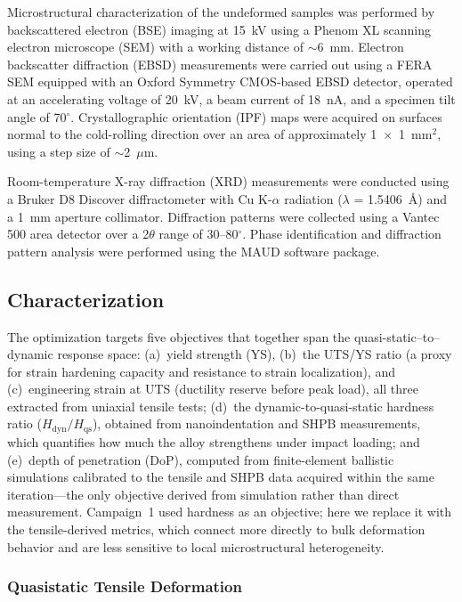 \documentclass[preprint,12pt,times]{elsarticle}  %
\begin{document}
Microstructural characterization of the undeformed samples was performed by backscattered electron (BSE) imaging at 15~kV using a Phenom XL scanning electron microscope (SEM) with a working distance of $\sim$6~mm. Electron backscatter diffraction (EBSD) measurements were carried out using a FERA SEM equipped with an Oxford Symmetry CMOS-based EBSD detector, operated at an accelerating voltage of 20~kV, a beam current of 18~nA, and a specimen tilt angle of 70$^\circ$. Crystallographic orientation (IPF) maps were acquired on surfaces normal to the cold-rolling direction over an area of approximately 1~$\times$~1~mm$^{2}$, using a step size of $\sim$2~$\mu$m.

Room-temperature X-ray diffraction (XRD) measurements were conducted using a Bruker D8 Discover diffractometer with Cu K-$\alpha$ radiation ($\lambda$ = 1.5406~\AA) and a 1~mm aperture collimator. Diffraction patterns were collected using a Vantec 500 area detector over a 2$\theta$ range of 30--80$^\circ$. Phase identification and diffraction pattern analysis were performed using the MAUD software package.

\subsection{Characterization}

The optimization targets five objectives that together span the quasi-static--to--dynamic response space: (a)~yield strength (YS), (b)~the UTS/YS ratio (a proxy for strain hardening capacity and resistance to strain localization), and (c)~engineering strain at UTS (ductility reserve before peak load), all three extracted from uniaxial tensile tests; (d)~the dynamic-to-quasi-static hardness ratio ($H_\text{dyn}/H_\text{qs}$), obtained from nanoindentation and SHPB measurements, which quantifies how much the alloy strengthens under impact loading; and (e)~depth of penetration (DoP), computed from finite-element ballistic simulations calibrated to the tensile and SHPB data acquired within the same iteration---the only objective derived from simulation rather than direct measurement. Campaign~1 used hardness as an objective; here we replace it with the tensile-derived metrics, which connect more directly to bulk deformation behavior and are less sensitive to local microstructural heterogeneity.

\subsubsection{Quasistatic Tensile Deformation}
\end{document}
